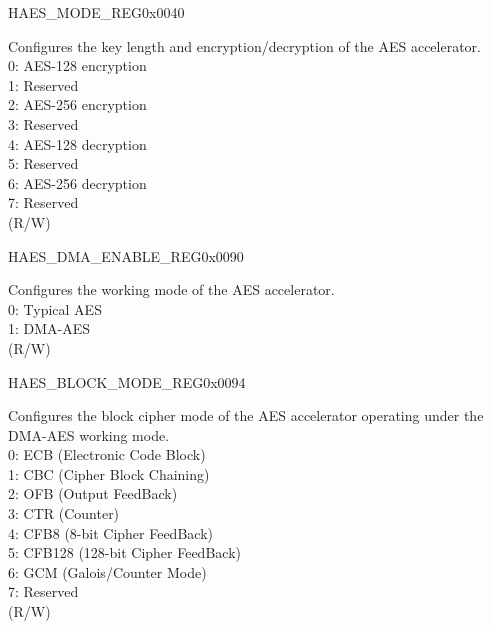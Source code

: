 \begin{register}{H}{AES\_MODE\_REG}{0x0040}\label{regdesc:AESMODEREG}
%
%
\regnewline%
\begin{regdesc}\begin{reglist}
\item [AES\_MODE] Configures the key length and encryption/decryption of the AES accelerator.\\
0: AES-128 encryption\\
1: Reserved\\
2: AES-256 encryption\\
3: Reserved\\
4: AES-128 decryption\\
5: Reserved\\
6: AES-256 decryption\\
7: Reserved\\
(R/W)
\end{reglist}\end{regdesc}
\end{register}


\begin{register}{H}{AES\_DMA\_ENABLE\_REG}{0x0090}\label{regdesc:AESDMAENABLEREG}
%
%
\regnewline%
\begin{regdesc}\begin{reglist}
\item [AES\_DMA\_ENABLE] Configures the working mode of the AES accelerator. \\
0: Typical AES\\
1: DMA-AES\\
(R/W)
\end{reglist}\end{regdesc}
\end{register}


\begin{register}{H}{AES\_BLOCK\_MODE\_REG}{0x0094}\label{regdesc:AESBLOCKMODEREG}
%
%
\regnewline%
\begin{regdesc}\begin{reglist}
\item [AES\_BLOCK\_MODE] Configures the block cipher mode of the AES accelerator operating under the DMA-AES working mode. \\
0: ECB (Electronic Code Block)\\
1: CBC (Cipher Block Chaining)\\
2: OFB (Output FeedBack)\\
3: CTR (Counter)\\
4: CFB8 (8-bit Cipher FeedBack)\\
5: CFB128 (128-bit Cipher FeedBack)\\
6: GCM (Galois/Counter Mode)\\
7: Reserved\\
(R/W)
\end{reglist}\end{regdesc}
\end{register}


